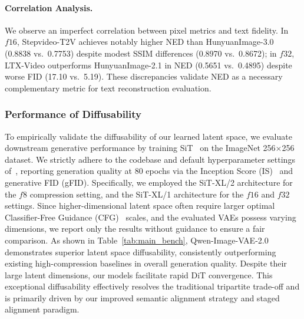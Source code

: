 \paragraph{Correlation Analysis.}
We observe an imperfect correlation between pixel metrics and text fidelity. In $f16$, Stepvideo-T2V achieves notably higher NED than HunyuanImage-3.0 (0.8838 vs.\ 0.7753) despite modest SSIM differences (0.8970 vs.\ 0.8672); in $f32$, LTX-Video outperforms HunyuanImage-2.1 in NED (0.5651 vs.\ 0.4895) despite worse FID (17.10 vs.\ 5.19). These discrepancies validate NED as a necessary complementary metric for text reconstruction evaluation.

\subsubsection{Performance of Diffusability}
To empirically validate the diffusability of our learned latent space, we evaluate downstream generative performance by training SiT~\citep{sit} on the ImageNet 256$\times$256 dataset. We strictly adhere to the codebase and default hyperparameter settings of~\citet{repa-e}, reporting generation quality at 80 epochs via the Inception Score (IS)~\citep{inception} and generative FID (gFID). Specifically, we employed the SiT-XL/2 architecture for the $f8$ compression setting, and the SiT-XL/1 architecture for the $f16$ and $f32$ settings. Since higher-dimensional latent space often require larger optimal Classifier-Free Guidance (CFG)~\citep{cfg} scales, and the evaluated VAEs possess varying dimensions, we report only the results without guidance to ensure a fair comparison. As shown in Table~\ref{tab:main_bench}, Qwen-Image-VAE-2.0 demonstrates superior latent space diffusability, consistently outperforming existing high-compression baselines in overall generation quality. Despite their large latent dimensions, our models facilitate rapid DiT convergence. This exceptional diffusability effectively resolves the traditional tripartite trade-off and is primarily driven by our improved semantic alignment strategy and staged alignment paradigm.

